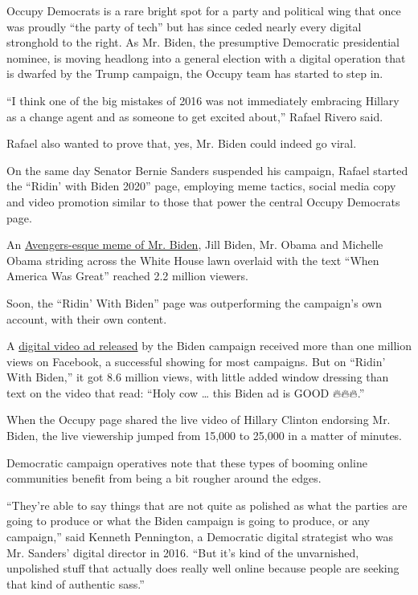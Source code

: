 Occupy Democrats is a rare bright spot for a party and political wing
that once was proudly ``the party of tech'' but has since ceded nearly
every digital stronghold to the right. As Mr. Biden, the presumptive
Democratic presidential nominee, is moving headlong into a general
election with a digital operation that is dwarfed by the Trump campaign,
the Occupy team has started to step in.

``I think one of the big mistakes of 2016 was not immediately embracing
Hillary as a change agent and as someone to get excited about,'' Rafael
Rivero said.

Rafael also wanted to prove that, yes, Mr. Biden could indeed go viral.

On the same day Senator Bernie Sanders suspended his campaign, Rafael
started the ``Ridin' with Biden 2020'' page, employing meme tactics,
social media copy and video promotion similar to those that power the
central Occupy Democrats page.

An
\href{https://www.facebook.com/ridinwithbiden2020/posts/119595033036839}{Avengers-esque
meme of Mr. Biden}, Jill Biden, Mr. Obama and Michelle Obama striding
across the White House lawn overlaid with the text ``When America Was
Great'' reached 2.2 million viewers.

Soon, the ``Ridin' With Biden'' page was outperforming the campaign's
own account, with their own content.

A
\href{https://www.facebook.com/7860876103/videos/3085674444800331}{digital
video ad released} by the Biden campaign received more than one million
views on Facebook, a successful showing for most campaigns. But on
``Ridin' With Biden,'' it got 8.6 million views, with little added
window dressing than text on the video that read: ``Holy cow \ldots{}
this Biden ad is GOOD 🔥🔥🔥.''

When the Occupy page shared the live video of Hillary Clinton endorsing
Mr. Biden, the live viewership jumped from 15,000 to 25,000 in a matter
of minutes.

Democratic campaign operatives note that these types of booming online
communities benefit from being a bit rougher around the edges.

``They're able to say things that are not quite as polished as what the
parties are going to produce or what the Biden campaign is going to
produce, or any campaign,'' said Kenneth Pennington, a Democratic
digital strategist who was Mr. Sanders' digital director in 2016. ``But
it's kind of the unvarnished, unpolished stuff that actually does really
well online because people are seeking that kind of authentic sass.''

